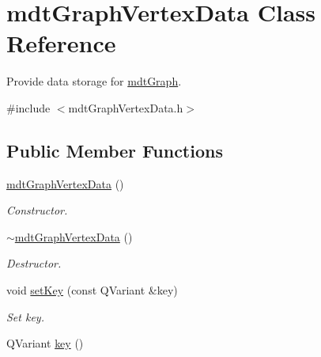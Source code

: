 \hypertarget{classmdt_graph_vertex_data}{
\section{mdtGraphVertexData Class Reference}
\label{classmdt_graph_vertex_data}
}


Provide data storage for \hyperlink{classmdt_graph}{mdtGraph}.  




{\ttfamily \#include $<$mdtGraphVertexData.h$>$}

\subsection*{Public Member Functions}
\begin{DoxyCompactItemize}
\item 
\hypertarget{classmdt_graph_vertex_data_a7ca3faa2d543be7dafca2a6bd91c25f8}{
\hyperlink{classmdt_graph_vertex_data_a7ca3faa2d543be7dafca2a6bd91c25f8}{mdtGraphVertexData} ()}
\label{classmdt_graph_vertex_data_a7ca3faa2d543be7dafca2a6bd91c25f8}

\begin{DoxyCompactList}\small\item\em Constructor. \end{DoxyCompactList}\item 
\hypertarget{classmdt_graph_vertex_data_a7f1ddf38418a56317d06355396a7cfb4}{
\hyperlink{classmdt_graph_vertex_data_a7f1ddf38418a56317d06355396a7cfb4}{$\sim$mdtGraphVertexData} ()}
\label{classmdt_graph_vertex_data_a7f1ddf38418a56317d06355396a7cfb4}

\begin{DoxyCompactList}\small\item\em Destructor. \end{DoxyCompactList}\item 
\hypertarget{classmdt_graph_vertex_data_ac4cc16346e055424fb69cf12628f97f2}{
void \hyperlink{classmdt_graph_vertex_data_ac4cc16346e055424fb69cf12628f97f2}{setKey} (const QVariant \&key)}
\label{classmdt_graph_vertex_data_ac4cc16346e055424fb69cf12628f97f2}

\begin{DoxyCompactList}\small\item\em Set key. \end{DoxyCompactList}\item 
\hypertarget{classmdt_graph_vertex_data_aa68cde603afff30f5ef15708aec2249e}{
QVariant \hyperlink{classmdt_graph_vertex_data_aa68cde603afff30f5ef15708aec2249e}{key} ()}
\label{classmdt_graph_vertex_data_aa68cde603afff30f5ef15708aec2249e}


\end{DoxyCompactItemize}
